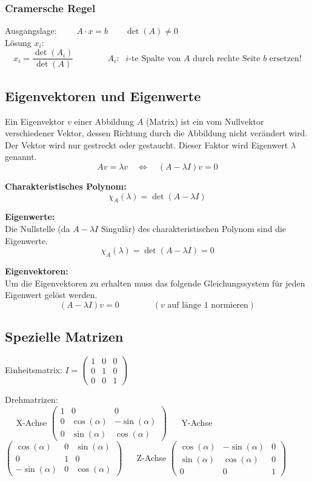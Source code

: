 \subsubsection{Cramersche Regel}
Ausgangslage: $\qquad A \cdot x = b \qquad \det(A)\neq 0$\\
Lösung $x_i$:
\[
	x_i=\frac{\det(A_i)}{\det(A)} \qquad \qquad A_i:\text{ $i$-te Spalte von $A$  durch rechte Seite  $b$ ersetzen!}
\]


\subsection{Eigenvektoren und Eigenwerte}
Ein Eigenvektor $v$ einer Abbildung $A$ (Matrix) ist ein vom Nullvektor
verschiedener Vektor, dessen Richtung durch die Abbildung nicht verändert wird. Der Vektor wird nur
gestreckt oder gestaucht. Dieser Faktor wird Eigenwert $\lambda$ genannt.
\[
	A v = \lambda v \quad \Leftrightarrow \quad (A-\lambda I)v=0
\]

\textbf{Charakteristisches Polynom:}\\
\[
	\chi_A(\lambda)=\det(A-\lambda I)
\]

\textbf{Eigenwerte:}\\
Die Nullstelle (da $A-\lambda I$ Singulär) des charakteristischen Polynom sind
die Eigenwerte. 
\[
	\chi_A(\lambda)=\det(A-\lambda I)=0
\]

\textbf{Eigenvektoren:}\\
Um die Eigenvektoren zu erhalten muss das folgende Gleichungssystem für jeden
Eigenwert gelöst werden.
\[ 
	(A-\lambda I)v=0 \qquad \qquad (v \text{ auf länge 1 normieren})
\]

\subsection{Spezielle Matrizen}
Einheitsmatrix: 
$I= \begin{pmatrix} 
1 & 0 & 0 \\
0 & 1 & 0 \\
0 & 0 & 1
\end{pmatrix}$

\vspace{0.5cm}

Drehmatrizen:
\\
$\quad$
X-Achse
$\begin{pmatrix} 
	1 & 0 & 0 \\
	0 & \cos(\alpha) & -\sin(\alpha) \\
	0 & \sin(\alpha) & \cos(\alpha)
\end{pmatrix}$
$\quad$
Y-Achse
$\begin{pmatrix} 
	\cos(\alpha) & 0 & \sin(\alpha) \\
	0 & 1 & 0 \\
	-\sin(\alpha) & 0 & \cos(\alpha)
\end{pmatrix}$
$\quad$
Z-Achse
$\begin{pmatrix} 
	\cos(\alpha) & -\sin(\alpha) & 0 \\
	\sin(\alpha) & \cos(\alpha) & 0 \\
	0 & 0 & 1
\end{pmatrix}$
